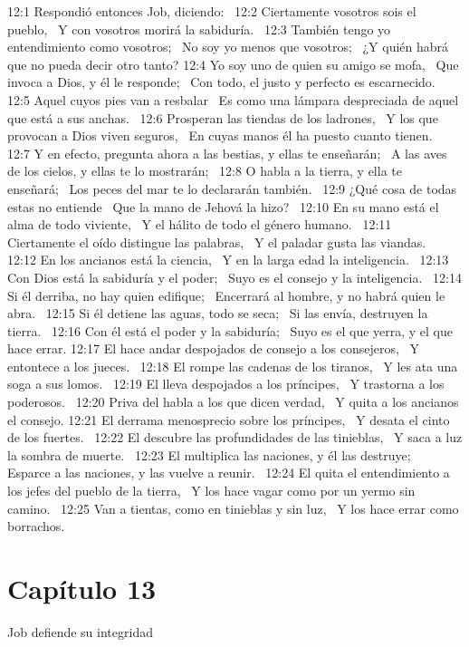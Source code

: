 12:1 Respondió entonces Job, diciendo:  
12:2 Ciertamente vosotros sois el pueblo,  
Y con vosotros morirá la sabiduría.  
12:3 También tengo yo entendimiento como vosotros;  
No soy yo menos que vosotros;  
¿Y quién habrá que no pueda decir otro tanto? 
12:4 Yo soy uno de quien su amigo se mofa,  
Que invoca a Dios, y él le responde;  
Con todo, el justo y perfecto es escarnecido.  
12:5 Aquel cuyos pies van a resbalar  
Es como una lámpara despreciada de aquel que está a sus anchas.  
12:6 Prosperan las tiendas de los ladrones,  
Y los que provocan a Dios viven seguros,  
En cuyas manos él ha puesto cuanto tienen.  
12:7 Y en efecto, pregunta ahora a las bestias, y ellas te enseñarán;  
A las aves de los cielos, y ellas te lo mostrarán;  
12:8 O habla a la tierra, y ella te enseñará;  
Los peces del mar te lo declararán también.  
12:9 ¿Qué cosa de todas estas no entiende  
Que la mano de Jehová la hizo?  
12:10 En su mano está el alma de todo viviente,  
Y el hálito de todo el género humano.  
12:11 Ciertamente el oído distingue las palabras,  
Y el paladar gusta las viandas.  
12:12 En los ancianos está la ciencia,  
Y en la larga edad la inteligencia.  
12:13 Con Dios está la sabiduría y el poder;  
Suyo es el consejo y la inteligencia.  
12:14 Si él derriba, no hay quien edifique;  
Encerrará al hombre, y no habrá quien le abra.  
12:15 Si él detiene las aguas, todo se seca;  
Si las envía, destruyen la tierra.  
12:16 Con él está el poder y la sabiduría;  
Suyo es el que yerra, y el que hace errar. 
12:17 El hace andar despojados de consejo a los consejeros,  
Y entontece a los jueces.  
12:18 El rompe las cadenas de los tiranos,  
Y les ata una soga a sus lomos.  
12:19 El lleva despojados a los príncipes,  
Y trastorna a los poderosos.  
12:20 Priva del habla a los que dicen verdad,  
Y quita a los ancianos el consejo. 
12:21 El derrama menosprecio sobre los príncipes,  
Y desata el cinto de los fuertes.  
12:22 El descubre las profundidades de las tinieblas,  
Y saca a luz la sombra de muerte.  
12:23 El multiplica las naciones, y él las destruye;  
Esparce a las naciones, y las vuelve a reunir.  
12:24 El quita el entendimiento a los jefes del pueblo de la tierra,  
Y los hace vagar como por un yermo sin camino.  
12:25 Van a tientas, como en tinieblas y sin luz,  
Y los hace errar como borrachos.  
\section*{Capítulo 13}
Job defiende su integridad  


